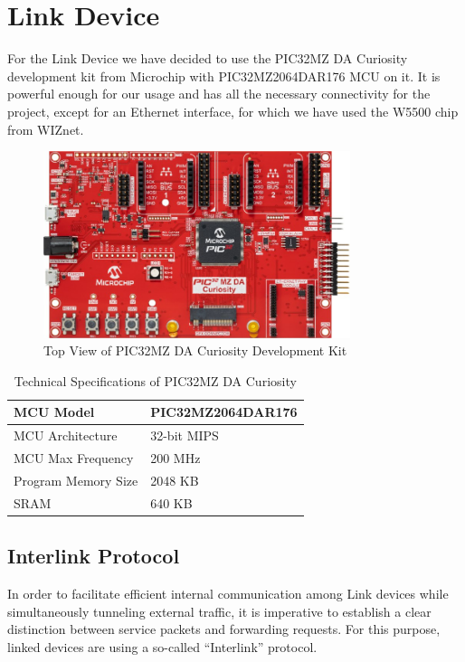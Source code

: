 \chapter{Link Device}
For the Link Device we have decided to use the PIC32MZ DA Curiosity development kit from Microchip with PIC32MZ2064DAR176 MCU on it. It is powerful enough for our usage and has all the necessary connectivity for the project, except for an Ethernet interface, for which we have used the W5500 chip from WIZnet.

\begin{figure}[htp]
\begin{center}
\includegraphics[width=0.8\textwidth]{PIC32MZ-DA-curiosity}
\end{center}
\caption{Top View of PIC32MZ DA Curiosity Development Kit}
\label{pic32da-curiosity-top-view}
\end{figure}

\begin{table}
\centering
\caption{Technical Specifications of PIC32MZ DA Curiosity \cite{pic-datasheet}}
\label{table1}
\begin{tabular}{|l|l|}
\hline 
MCU Model & PIC32MZ2064DAR176 \\ \hline
MCU Architecture & 32-bit MIPS \\ \hline
MCU Max Frequency & 200 MHz \\ \hline
Program Memory Size & 2048 KB \\ \hline
SRAM & 640 KB \\ \hline
\end{tabular}
\end{table}

\section{Interlink Protocol}

In order to facilitate efficient internal communication among Link devices while simultaneously tunneling external traffic, it is imperative to establish a clear distinction between service packets and forwarding requests. For this purpose, linked devices are using a so-called “Interlink” protocol. 

